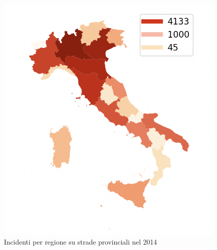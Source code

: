 \documentclass[a4paper]{report}
\begin{document}
\begin{figure}
    \includegraphics[width=\linewidth]{../src/incidenti/incidenti_aci/mappe_regioni/incidenti_per_regione.png}
    \caption{Incidenti per regione su strade provinciali nel 2014}
    \label{fig:incidenti-per-regione}
\end{figure}
\end{document}
